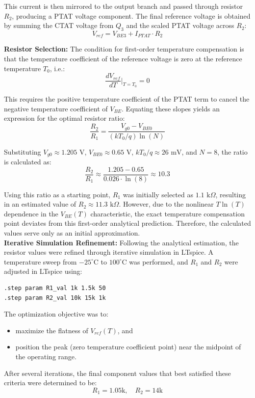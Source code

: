 \documentclass[12pt]{article}
\begin{document}
This current is then mirrored to the output branch and passed through resistor $R_2$, producing a PTAT voltage component. The final reference voltage is obtained by summing the CTAT voltage from $Q_3$ and the scaled PTAT voltage across $R_2$:
\begin{equation*}
V_{ref} = V_{BE3} + I_{PTAT} \cdot R_2
\end{equation*}

\noindent
\textbf{Resistor Selection:}
The condition for first-order temperature compensation is that the temperature coefficient of the reference voltage is zero at the reference temperature $T_0$, i.e.:
\begin{equation*}
\frac{dV_{ref}}{dT} \bigg|_{T=T_0} = 0
\end{equation*}

This requires the positive temperature coefficient of the PTAT term to cancel the negative temperature coefficient of $V_{BE}$. Equating these slopes yields an expression for the optimal resistor ratio:
\begin{equation*}
\frac{R_2}{R_1} = \frac{V_{g0} - V_{BE0}}{(kT_0/q)\ln(N)}
\end{equation*}

Substituting $V_{g0} \approx 1.205\text{ V}$, $V_{BE0} \approx 0.65\text{ V}$, $kT_0/q \approx 26\text{ mV}$, and $N=8$, the ratio is calculated as:
\begin{equation*}
\frac{R_2}{R_1} \approx \frac{1.205 - 0.65}{0.026 \cdot \ln(8)} \approx 10.3
\end{equation*}

Using this ratio as a starting point, $R_1$ was initially selected as $1.1\text{ k}\Omega$, resulting in an estimated value of $R_2 \approx 11.3\text{ k}\Omega$.
However, due to the nonlinear $T \ln(T)$ dependence in the $V_{BE}(T)$ characteristic, the exact temperature compensation point deviates from this first-order analytical prediction. Therefore, the calculated values serve only as an initial approximation.\\ 
\newline
\noindent
\textbf{Iterative Simulation Refinement:}
Following the analytical estimation, the resistor values were refined through iterative simulation in LTspice. A temperature sweep from $-25^\circ\text{C}$ to $100^\circ\text{C}$ was performed, and $R_1$ and $R_2$ were adjusted in LTspice using:
\begin{verbatim}
.step param R1_val 1k 1.5k 50 
.step param R2_val 10k 15k 1k
\end{verbatim}
The optimization objective was to:
\begin{itemize}
    \item maximize the flatness of $V_{ref}(T)$, and
    \item position the peak (zero temperature coefficient point) near the midpoint of the operating range.
\end{itemize}
After several iterations, the final component values that best satisfied these criteria were determined to be:
\begin{equation*}
R_1 = 1.05\text{k}, \quad R_2 = 14\text{k}
\end{equation*}
\end{document}
